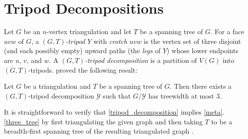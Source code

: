 \documentclass{patmorin}
\begin{document}
%

\section{Tripod Decompositions}
\label{tripod_decompositions}

Let $G$ be an $n$-vertex triangulation and let $T$ be a spanning tree of $G$. For a face $uvw$ of $G$, a \emph{$(G,T)$-tripod} $Y$ with \emph{crotch} $uvw$ is the vertex set of three disjoint (and each possibly empty) upward paths (the \emph{legs} of $Y$) whose lower endpoints are $u$, $v$, and $w$.  A \emph{$(G,T)$-tripod decomposition} is a partition of $V(G)$ into $(G,T)$-tripods.  \citet{dujmovic.joret.ea:planar} proved the following result:

\begin{thm}\label{tripod_decomposition}
  Let $G$ be a triangulation and $T$ be a spanning tree of $G$.  Then there exists a $(G,T)$-tripod decomposition $\mathcal{Y}$ such that $G/\mathcal{Y}$ has treewidth at most $3$.
\end{thm}

It is straightforward to verify that \cref{tripod_decomposition} implies \cref{meta}.\ref{three_tree} by first triangulating the given graph and then taking $T$ to be a breadth-first spanning tree of the resulting triangulated graph \cite[Observation~35]{dujmovic.joret.ea:planar}.
\end{document}

